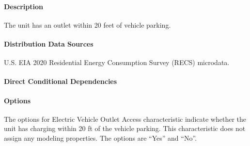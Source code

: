\paragraph{Description}
% 
The unit has an outlet within 20 feet of vehicle parking.

\paragraph{Distribution Data Sources}
% 
U.S. EIA 2020 Residential Energy Consumption Survey (RECS) microdata.

\paragraph{Direct Conditional Dependencies}


\paragraph{Options}
The options for Electric Vehicle Outlet Access characteristic indicate whether the unit has charging within 20 ft of the vehicle parking. This characteristic does not assign any modeling properties. The options are ``Yes'' and ``No''.

